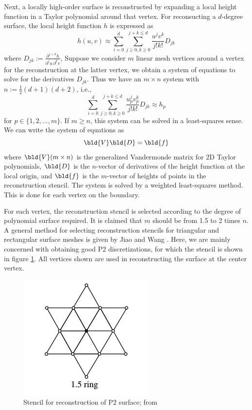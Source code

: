 Next, a locally high-order surface is reconstructed by expanding a local height function in a Taylor polynomial around that vertex. For reconsucting a $d$-degree surface, the local height function $h$ is expressed as
\begin{equation}
h(u,v) \approx \sum_{i=0}^d \sum_{j\geq 0,k\geq 0}^{j+k \leq d} \frac{u^j v^k}{j!k!} D_{jk}
\end{equation}
where $D_{jk} := \frac{\partial^{j+k} h}{\partial^j u \, \partial^k v}$,
Suppose we consider $m$ linear mesh vertices around a vertex for the reconstruction at the latter vertex, we obtain a system of equations to solve for the derivatives $D_{jk}$. Thus we have an $m \times n$ system with $n:= \frac12 (d+1)(d+2)$, i.e.,
\begin{equation}
\sum_{i=0}^d \sum_{j\geq 0,k\geq 0}^{j+k \leq d} \frac{u_p^j v_p^k}{j!k!} D_{jk} \approx h_p
\label{eq:sr_taylorequation}
\end{equation}
for $p \in \{1,2,...,m \}$. If $m \ge n$, this system can be solved in a least-squares sense. We can write the system of equations as
\begin{equation}
\bld{V} \bld{D} = \bld{f}
\end{equation}
where $\bld{V} (m\times n)$ is the generalized Vandermonde matrix for 2D Taylor polynomials, $\bld{D}$ is the $n$-vector of derivatives of the height function at the local origin, and $\bld{f}$ is the $m$-vector of heights of points in the reconstruction stencil. The system is solved by a weighted least-squares method. This is done for each vertex on the boundary.

For each vertex, the reconstruction stencil is selected according to the degree of polynomial surface required. It is claimed \cite{sr:diffquant} that $m$ should be from 1.5 to 2 times $n$. A general method for selecting reconstruction stencils for triangular and rectangular surface meshes is given by Jiao and Wang \cite{sr:jiaowang}. Here, we are mainly concerned with obtaining good P2 discretizations, for which the stencil is shown in figure \ref{f:stencil}. All vertices shown are used in reconstructing the surface at the center vertex.

\begin{figure}
	\centering
	\includegraphics[scale=1.0]{stencil}
	\caption{Stencil for reconstruction of P2 surface; from \cite{sr:jiaowang}}
	\label{f:stencil}
\end{figure}

